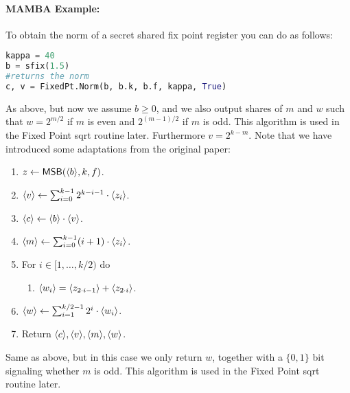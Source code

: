   \paragraph{MAMBA Example:} To obtain the norm of a secret shared fix point register you can do as follows:
  \begin{lstlisting}[language={python}]
kappa = 40
b = sfix(1.5)
#returns the norm
c, v = FixedPt.Norm(b, b.k, b.f, kappa, True)
\end{lstlisting}

  As above, but now we assume $b \ge 0$, and we also
  output shares of $m$ and $w$ such that $w=2^{m/2}$
  if $m$ is even and $2^{(m-1)/2}$ if $m$ is odd.
  This algorithm is used in the Fixed Point sqrt routine later.
  Furthermore $v = 2^{k-m}$. Note that we have introduced some adaptations from the original paper:
  \begin{enumerate}
    \item $z \leftarrow \mathsf{MSB}(\langle b \rangle,k,f)$.
    \item $\langle v \rangle \leftarrow \sum_{i=0}^{k-1} 2^{k-i-1} \cdot \langle z_i \rangle$.
    \item $\langle c \rangle \leftarrow \langle b \rangle \cdot \langle v \rangle$.
    \item $\langle m \rangle \leftarrow \sum_{i=0}^{k-1} (i+1) \cdot \langle z_i \rangle$.
    \item For $i \in [1,\ldots,k/2)$ do
          \begin{enumerate}
            \item $\langle w_i \rangle=\langle z_{2\cdot i-1} \rangle+\langle z_{2\cdot i} \rangle$.
          \end{enumerate}
    \item $\langle w \rangle \leftarrow \sum_{i=1}^{k/2-1} 2^i \cdot \langle w_i \rangle$.
    \item Return $\langle c \rangle, \langle v \rangle, \langle m \rangle, \langle w \rangle$.
  \end{enumerate}

  Same as above, but in this case we only return $w$, together with a $\{0,1\}$ bit signaling whether $m$ is odd.
  This algorithm is used in the Fixed Point sqrt routine later.


